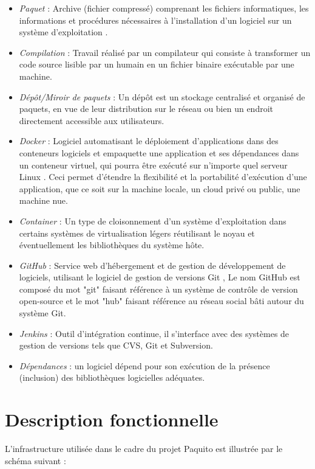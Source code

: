 \documentclass[12pt,a4paper]{article}
\begin{document}
\begin{itemize}\renewcommand{\labelitemi}{$\bullet$}
\item \textit{Paquet} : Archive (fichier compressé) comprenant les fichiers informatiques, les informations et procédures nécessaires à l'installation d'un logiciel sur un système d'exploitation .
\item \textit{Compilation} : Travail réalisé par un compilateur qui consiste à transformer un code source lisible par un humain en un fichier binaire exécutable par une machine.
\item \textit{Dépôt/Miroir de paquets} : Un dépôt est un stockage centralisé et organisé de paquets, en vue de leur distribution sur le réseau ou bien un endroit directement accessible aux utilisateurs.
\item \textit{Docker} : Logiciel automatisant le déploiement d'applications dans des conteneurs logiciels et empaquette une application et ses dépendances dans un conteneur virtuel, qui pourra être exécuté sur n'importe quel serveur Linux . Ceci permet d'étendre la flexibilité et la portabilité d’exécution d'une application, que ce soit sur la machine locale, un cloud privé ou public, une machine nue. 
\item \textit{Container} : Un type de cloisonnement d'un système d'exploitation dans certains systèmes de virtualisation légers réutilisant le noyau et éventuellement les bibliothèques du système hôte.
\item \textit{GitHub} : Service web d'hébergement et de gestion de développement de logiciels, utilisant le logiciel de gestion de versions Git , Le nom GitHub est composé du mot "git" faisant référence à un système de contrôle de version open-source et le mot "hub" faisant référence au réseau social bâti autour du système Git.
\item \textit{Jenkins} : Outil d'intégration continue,  il s'interface avec des systèmes de gestion de versions tels que CVS, Git et Subversion.
\item \textit{Dépendances} : un logiciel dépend pour son exécution de la présence (inclusion) des bibliothèques logicielles adéquates.
\end{itemize}

\section{Description fonctionnelle}

L'infrastructure utilisée dans le cadre du projet Paquito est illustrée par le schéma suivant :
\end{document}
